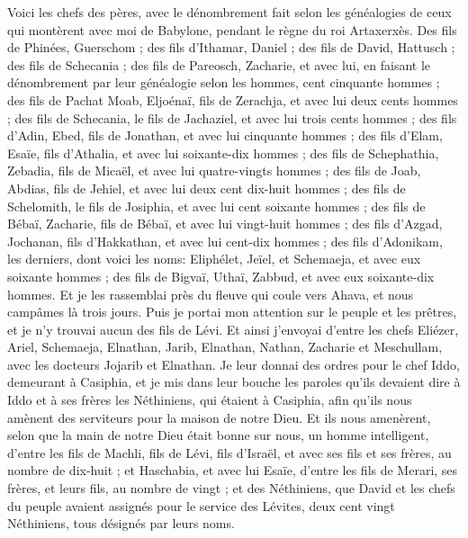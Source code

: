 \begin{multicols}{2}
\VerseOne{}Voici les chefs des pères, avec le dénombrement fait selon les généalogies de ceux qui montèrent avec moi de Babylone, pendant le règne du roi Artaxerxès.
Des fils de Phinées, Guerschom ; des fils d'Ithamar, Daniel ; des fils de David, Hattusch ;
des fils de Schecania ; des fils de Pareosch, Zacharie, et avec lui, en faisant le dénombrement par leur généalogie selon les hommes, cent cinquante hommes ;
des fils de Pachat Moab, Eljoénaï, fils de Zerachja, et avec lui deux cents hommes ;
des fils de Schecania, le fils de Jachaziel, et avec lui trois cents hommes ;
des fils d'Adin, Ebed, fils de Jonathan, et avec lui cinquante hommes ;
des fils d'Elam, Esaïe, fils d'Athalia, et avec lui soixante-dix hommes ;
des fils de Schephathia, Zebadia, fils de Micaël, et avec lui quatre-vingts hommes ;
des fils de Joab, Abdias, fils de Jehiel, et avec lui deux cent dix-huit hommes ;
des fils de Schelomith, le fils de Josiphia, et avec lui cent soixante hommes ;
des fils de Bébaï, Zacharie, fils de Bébaï, et avec lui vingt-huit hommes ;
des fils d'Azgad, Jochanan, fils d'Hakkathan, et avec lui cent-dix hommes ;
des fils d'Adonikam, les derniers, dont voici les noms: Eliphélet, Jeïel, et Schemaeja, et avec eux soixante hommes ;
des fils de Bigvaï, Uthaï, Zabbud, et avec eux soixante-dix hommes.
Et je les rassemblai près du fleuve qui coule vers Ahava, et nous campâmes là trois jours. Puis je portai mon attention sur le peuple et les prêtres, et je n'y trouvai aucun des fils de Lévi.
Et ainsi j'envoyai d'entre les chefs Eliézer, Ariel, Schemaeja, Elnathan, Jarib, Elnathan, Nathan, Zacharie et Meschullam, avec les docteurs Jojarib et Elnathan.
Je leur donnai des ordres pour le chef Iddo, demeurant à Casiphia, et je mis dans leur bouche les paroles qu'ils devaient dire à Iddo et à ses frères les Néthiniens, qui étaient à Casiphia, afin qu'ils nous amènent des serviteurs pour la maison de notre Dieu.
 Et ils nous amenèrent, selon que la main de notre Dieu était bonne sur nous, un homme intelligent, d'entre les fils de Machli, fils de Lévi, fils d'Israël, et avec ses fils et ses frères, au nombre de dix-huit ;
et Haschabia, et avec lui Esaïe, d'entre les fils de Merari, ses frères, et leurs fils, au nombre de vingt ;
et des Néthiniens, que David et les chefs du peuple avaient assignés pour le service des Lévites, deux cent vingt Néthiniens, tous désignés par leurs noms.

\end{multicols}
